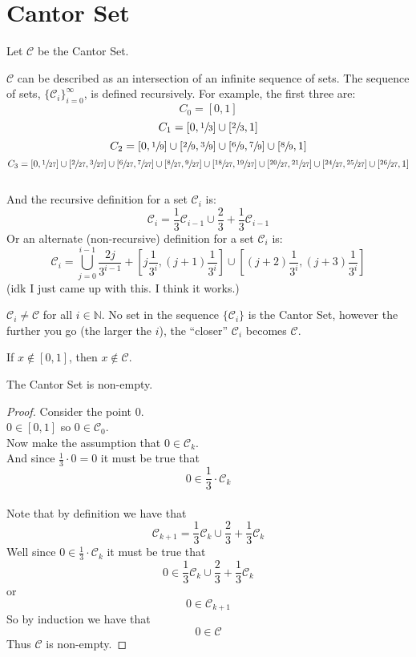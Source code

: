 \documentclass[11pt]{ekblite}
\begin{document}
\section{Cantor Set}
	Let $\mathcal{C}$ be the Cantor Set.
	\begin{definition}
        $\mathcal{C}$ can be described as an intersection of an infinite sequence of sets. The sequence of sets, $\{\mathcal{C}_i\}_{i=0}^{\infty}$, is defined recursively. For example, the first three are:
		\[C_0 = [0,1]\]
		\[C_1 = \left[0,\sfrac{1}{3}  \right] \cup \left[ \sfrac{2}{3},1\right]\]
		\[C_2 = \left[0,\sfrac{1}{9}  \right] \cup \left[ \sfrac{2}{9},\sfrac{3}{9} \right] \cup \left[\sfrac{6}{9},\sfrac{7}{9}\right] \cup \left[ \sfrac{8}{9},1\right]\]
		\[C_3 = \left[0,\sfrac{1}{27}  \right] \cup \left[\sfrac{2}{27},\sfrac{3}{27}  \right] \cup \left[\sfrac{6}{27},\sfrac{7}{27}  \right] \cup \left[\sfrac{8}{27},\sfrac{9}{27}  \right] \cup \left[\sfrac{18}{27},\sfrac{19}{27}  \right] \cup \left[\sfrac{20}{27},\sfrac{21}{27}  \right] \cup \left[\sfrac{24}{27},\sfrac{25}{27}  \right] \cup \left[\sfrac{26}{27},1  \right]\]
		\\
		And the recursive definition for a set $\mathcal{C}_i$ is:
		\[\mathcal{C}_i = \frac{1}{3} \mathcal{C}_{i-1} \cup \frac{2}{3} + \frac{1}{3} \mathcal{C}_{i-1}\]
		Or an alternate (non-recursive) definition for a set $\mathcal{C}_i$ is:
		\[\mathcal{C}_i = \bigcup_{j=0}^{i-1} \frac{2j}{3^{i-1}} + \left[j\frac{1}{3^i}, (j+1)\frac{1}{3^i}\right] \cup \left[(j+2)\frac{1}{3^i}, (j+3)\frac{1}{3^i}\right]\]
		(idk I just came up with this. I think it works.)
	\end{definition}
	\begin{corollary}
		$\mathcal{C}_i \ne \mathcal{C}$ for all $i \in \mathbb{N}$. No set in the sequence $\{\mathcal{C}_i\}$ is the Cantor Set, however the further you go (the larger the $i$), the ``closer'' $\mathcal{C}_i$ becomes $\mathcal{C}$. 
	\end{corollary}
	\begin{corollary}
		If $x \notin [0,1]$, then $x \notin \mathcal{C}$.
	\end{corollary}
	\begin{corollary}
		The Cantor Set is non-empty.
	\end{corollary}
	\begin{proof}Consider the point 0.
	\\[0.2in]$0 \in [0,1]$ so $0 \in \mathcal{C}_0$.
	\\[0.2in]Now make the assumption that $0 \in \mathcal{C}_k$.
	\\[0.2in]And since $\frac{1}{3} \cdot 0 = 0$ it must be true that
	\[0 \in \frac{1}{3} \cdot \mathcal{C}_k\] 
	\\[0.2in]Note that by definition we have that
	\[\mathcal{C}_{k+1} = \frac{1}{3} \mathcal{C}_{k} \cup \frac{2}{3} + \frac{1}{3} \mathcal{C}_{k}\]
	Well since $0 \in \frac{1}{3} \cdot \mathcal{C}_k$ it must be true that
	\[0 \in \frac{1}{3} \mathcal{C}_{k} \cup \frac{2}{3} + \frac{1}{3} \mathcal{C}_{k}\]
	or
	\[0 \in \mathcal{C}_{k+1}\]
	So by induction we have that
	\[0 \in \mathcal{C}\]
	Thus $\mathcal{C}$ is non-empty.
	\end{proof}
\end{document}
